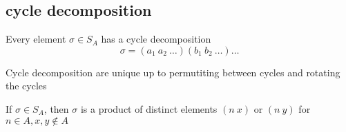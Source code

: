 \subsection{cycle decomposition}

\begin{example}
  Every element $\sigma \in S_A$ has a cycle decomposition
  \[\sigma = (a_1\ a_2\ \dotsc)(b_1\ b_2\ \dotsc)\dotsc\]
\end{example}

\begin{theorem}
  Cycle decomposition are unique up to  permutiting between cycles and rotating the cycles
\end{theorem}

\begin{theorem}
  If $\sigma \in S_A$, then $\sigma$ is a product of distinct elements $(n\ x)$ or $(n\ y)$ for $n \in A, x,y \notin A$
\end{theorem}